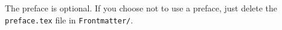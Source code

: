 The preface is optional. 
If you choose not to use a preface, just delete the \texttt{preface.tex} file in \texttt{Frontmatter/}.